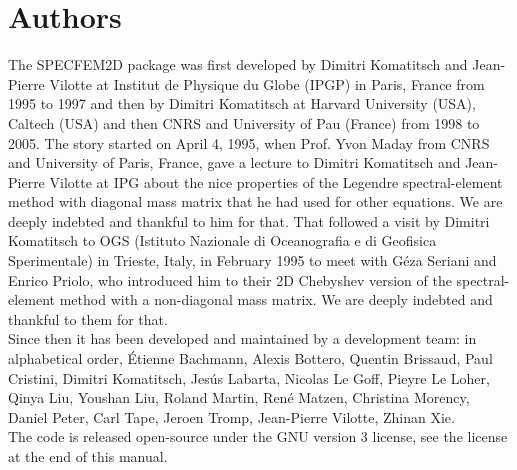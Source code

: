 \section*{Authors}

The SPECFEM2D package was first developed by Dimitri
Komatitsch and Jean-Pierre Vilotte at Institut de Physique du Globe
(IPGP) in Paris, France from 1995 to 1997 and then by Dimitri Komatitsch
at Harvard University (USA), Caltech (USA) and then CNRS and University of Pau (France) from 1998 to 2005.
The story started on April 4, 1995, when Prof. Yvon Maday from CNRS and University of Paris, France, gave a lecture to
Dimitri Komatitsch and Jean-Pierre Vilotte at IPG about the nice properties of the Legendre spectral-element method with diagonal mass matrix that he had used for
other equations. We are deeply indebted and thankful to him for that.
That followed a visit by Dimitri Komatitsch to OGS (Istituto Nazionale di Oceanografia e di Geofisica Sperimentale) in Trieste, Italy, in February 1995
to meet with G\'eza Seriani and Enrico Priolo, who introduced him to their 2D Chebyshev version of the spectral-element method with a non-diagonal mass matrix.
We are deeply indebted and thankful to them for that.\\

Since then it has been developed and maintained by a development team: in alphabetical order,
\'Etienne Bachmann,
Alexis Bottero,
Quentin Brissaud,
Paul Cristini,
Dimitri Komatitsch,
Jes\'us Labarta,
Nicolas Le Goff,
Pieyre Le Loher,
Qinya Liu,
Youshan Liu,
Roland Martin,
Ren\'e Matzen,
Christina Morency,
Daniel Peter,
Carl Tape,
Jeroen Tromp,
Jean-Pierre Vilotte,
Zhinan Xie.\\

The code is released open-source under the GNU version 3 license, see the license at the end of this manual.

